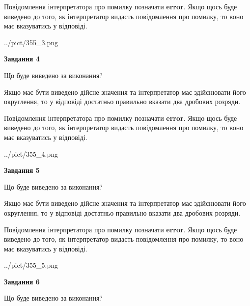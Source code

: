 \documentclass[12pt, ukrainian]{article}
\begin{document}
{\begin {Large}
Повідомлення інтерпретатора про помилку позначати \textbf{error}.
Якщо щось буде виведено до того, як інтерпретатор видасть повідомлення про помилку, 
то воно має вказуватись у відповіді. \par

\begin{center}
	{../pict/355_3.png}
\end{center}
\newpage

{\begin {center}\textbf{Завдання 4}\end {center}}\par
Що буде виведено за виконання? \par

Якщо має бути виведено дійсне значення та інтерпретатор має здійснювати його округлення, 
то у відповіді достатньо правильно вказати два дробових розряди.

Повідомлення інтерпретатора про помилку позначати \textbf{error}.
Якщо щось буде виведено до того, як інтерпретатор видасть повідомлення про помилку, 
то воно має вказуватись у відповіді. \par

\begin{center}
	{../pict/355_4.png}
\end{center}
\newpage

{\begin {center}\textbf{Завдання 5}\end {center}}\par
Що буде виведено за виконання? \par

Якщо має бути виведено дійсне значення та інтерпретатор має здійснювати його округлення, 
то у відповіді достатньо правильно вказати два дробових розряди.

Повідомлення інтерпретатора про помилку позначати \textbf{error}.
Якщо щось буде виведено до того, як інтерпретатор видасть повідомлення про помилку, 
то воно має вказуватись у відповіді. \par

\begin{center}
	{../pict/355_5.png}
\end{center}
\newpage

{\begin {center}\textbf{Завдання 6}\end {center}}\par
Що буде виведено за виконання? \par


\end{Large}}
\end{document}

